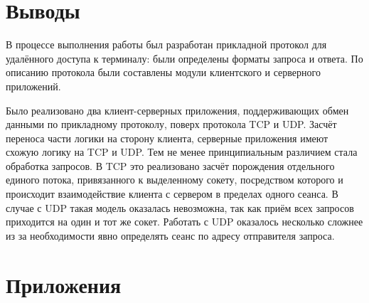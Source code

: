 \section{Выводы}

В процессе выполнения работы был разработан прикладной протокол для удалённого доступа к терминалу: были определены форматы запроса и ответа. По
описанию протокола были составлены модули клиентского и серверного приложений. 

Было реализовано два клиент-серверных приложения, поддерживающих обмен данными по прикладному протоколу, поверх протокола TCP и UDP. Засчёт переноса части логики на сторону клиента, серверные приложения имеют схожую логику на TCP и UDP. Тем не менее принципиальным различием стала обработка запросов. В TCP это реализовано засчёт порождения отдельного единого потока, привязанного к выделенному сокету, посредством которого и происходит взаимодействие клиента с сервером в пределах одного сеанса. В случае с UDP такая модель оказалась невозможна, так как приём всех запросов приходится на один и тот же сокет. Работать с UDP оказалось несколько сложнее из за необходимости явно определять сеанс по адресу отправителя запроса.

\newpage

\section*{Приложения}











